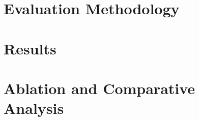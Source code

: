 \documentclass[conference]{IEEEtran}
\begin{document}
\section{Evaluation Methodology}

\section{Results}

\section{Ablation and Comparative Analysis}
\end{document}
